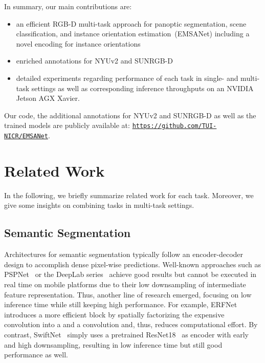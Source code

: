 \documentclass[conference]{IEEEtran}
\begin{document}
\noindent In summary, our main contributions are:
\begin{itemize}[leftmargin=5mm]
    \item an efficient RGB-D multi-task approach for panoptic segmentation, scene classification, and instance orientation estimation~(EMSANet) including a novel encoding for instance orientations
    \item enriched annotations for NYUv2 and SUNRGB-D\item detailed experiments regarding performance of each task in single- and multi-task settings as well as corresponding inference throughputs on an NVIDIA Jetson AGX Xavier.
\end{itemize}

Our code, the additional annotations for NYUv2 and SUNRGB-D as well as the trained models are publicly available at: {\small\href{https://github.com/TUI-NICR/EMSANet}{\texttt{\url{https://github.com/TUI-NICR/EMSANet}}}}.










 \section{Related Work}
\label{sec:related_work}
In the following, we briefly summarize related work for each task. 
Moreover, we give some insights on combining tasks in multi-task settings.

\subsection{Semantic Segmentation}
\label{sec:related_work:semantic_segmentation}
Architectures for semantic segmentation typically follow an encoder-decoder design to accomplish dense pixel-wise predictions.
Well-known approaches such as PSPNet~\cite{PSPNet-cvpr2017} or the DeepLab series~\cite{DeepLab-iclr2015, DeepLabv3-arxiv2017, DeepLabv3plus-eccv-2018} achieve good results but cannot be executed in real time on mobile platforms due to their low downsampling of intermediate feature representation.
Thus, another line of research emerged, focusing on low inference time while still keeping high performance.
For example, ERFNet~\cite{ERFNet-its2018} introduces a more efficient block by spatially factorizing the expensive  convolution into a  and a  convolution and, thus, reduces computational effort.
By contrast, SwiftNet~\cite{SwiftNet-cvpr2019} simply uses a pretrained ResNet18~\cite{ResNet-cvpr2016} as encoder with early and high downsampling, resulting in low inference time but still good performance as well.
\end{document}
